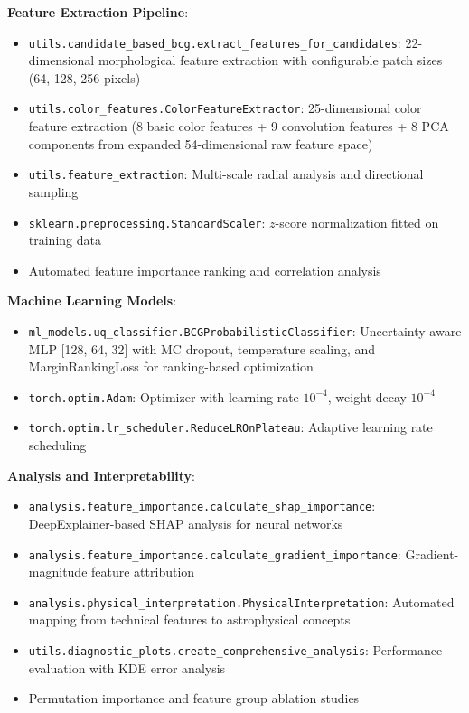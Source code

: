 \documentclass[twocolumn,10pt]{aastex631}
\begin{document}
\textbf{Feature Extraction Pipeline}:
\begin{itemize}
\item \texttt{utils.candidate\_based\_bcg.extract\_features\_for\_candidates}: 22-dimensional morphological feature extraction with configurable patch sizes (64, 128, 256 pixels)
\item \texttt{utils.color\_features.ColorFeatureExtractor}: 25-dimensional color feature extraction (8 basic color features + 9 convolution features + 8 PCA components from expanded 54-dimensional raw feature space)
\item \texttt{utils.feature\_extraction}: Multi-scale radial analysis and directional sampling
\item \texttt{sklearn.preprocessing.StandardScaler}: $z$-score normalization fitted on training data
\item Automated feature importance ranking and correlation analysis
\end{itemize}

\textbf{Machine Learning Models}:
\begin{itemize}
\item \texttt{ml\_models.uq\_classifier.BCGProbabilisticClassifier}: Uncertainty-aware MLP [128, 64, 32] with MC dropout, temperature scaling, and MarginRankingLoss for ranking-based optimization
\item \texttt{torch.optim.Adam}: Optimizer with learning rate $10^{-4}$, weight decay $10^{-4}$
\item \texttt{torch.optim.lr\_scheduler.ReduceLROnPlateau}: Adaptive learning rate scheduling
\end{itemize}

\textbf{Analysis and Interpretability}:
\begin{itemize}
\item \texttt{analysis.feature\_importance.calculate\_shap\_importance}: DeepExplainer-based SHAP analysis for neural networks
\item \texttt{analysis.feature\_importance.calculate\_gradient\_importance}: Gradient-magnitude feature attribution
\item \texttt{analysis.physical\_interpretation.PhysicalInterpretation}: Automated mapping from technical features to astrophysical concepts
\item \texttt{utils.diagnostic\_plots.create\_comprehensive\_analysis}: Performance evaluation with KDE error analysis
\item Permutation importance and feature group ablation studies
\end{itemize}
\end{document}
